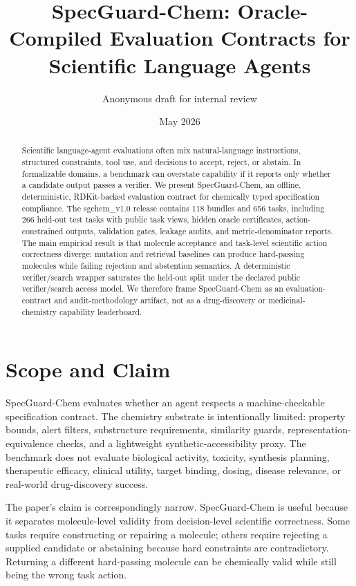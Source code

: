 \documentclass[11pt]{article}
\title{SpecGuard-Chem: Oracle-Compiled Evaluation Contracts for Scientific Language Agents}
\author{Anonymous draft for internal review}
\date{May 2026}
\begin{document}
\maketitle

\begin{abstract}
Scientific language-agent evaluations often mix natural-language instructions,
structured constraints, tool use, and decisions to accept, reject, or abstain.
In formalizable domains, a benchmark can overstate capability if it reports only
whether a candidate output passes a verifier. We present SpecGuard-Chem, an
offline, deterministic, RDKit-backed evaluation contract for chemically typed
specification compliance. The sgchem\_v1.0 release contains 118 bundles and 656
tasks, including 266 held-out test tasks with public task views, hidden oracle
certificates, action-constrained outputs, validation gates, leakage audits, and
metric-denominator reports. The main empirical result is that molecule
acceptance and task-level scientific action correctness diverge: mutation and
retrieval baselines can produce hard-passing molecules while failing rejection
and abstention semantics. A deterministic verifier/search wrapper saturates the
held-out split under the declared public verifier/search access model. We
therefore frame SpecGuard-Chem as an evaluation-contract and audit-methodology
artifact, not as a drug-discovery or medicinal-chemistry capability leaderboard.
\end{abstract}

\section{Scope and Claim}

SpecGuard-Chem evaluates whether an agent respects a machine-checkable
specification contract. The chemistry substrate is intentionally limited:
property bounds, alert filters, substructure requirements, similarity guards,
representation-equivalence checks, and a lightweight synthetic-accessibility
proxy. The benchmark does not evaluate biological activity, toxicity, synthesis
planning, therapeutic efficacy, clinical utility, target binding, dosing,
disease relevance, or real-world drug-discovery success.

The paper's claim is correspondingly narrow. SpecGuard-Chem is useful because it
separates molecule-level validity from decision-level scientific correctness.
Some tasks require constructing or repairing a molecule; others require rejecting
a supplied candidate or abstaining because hard constraints are contradictory.
Returning a different hard-passing molecule can be chemically valid while still
being the wrong task action.
\end{document}
